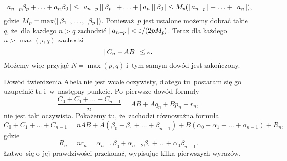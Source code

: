 \documentclass[a4paper,11pt]{article}
\begin{document}
\begin{equation}
  \label{eq:Leja-Funkcje-zespolone-17}
  |\, {  a_{ n - p } \beta_{ p } + \ldots + a_{ n } \beta_{ 0 }  } \,| \leq
  |\, {  a_{ n - p }  } \,| |\, {  \beta_{ p }  } \,| + \ldots + |\, {  a_{ n }  } \,|
  |\, {  \beta_{ 0 }  } \,| \leq
  M_{ p } ( |\, {  a_{ n - p }  } \,| + \ldots + |\, {  a_{ n }  } \,| ),
\end{equation}
gdzie
$M_{ p } = \max( |\, {  \beta_{ 1 }  } \,|, \ldots, |\, {  \beta_{ p }  } \,| )$.
Ponieważ~$p$ jest ustalone możemy dobrać takie $q$, że~dla każdego
$n > q$ zachodzić
$|\, {  a_{ n - p }  } \,| < \varepsilon / ( 2 p M_{ p } )$. Teraz dla każdego
$n > \max( p, q )$ zachodzi
\begin{equation}
  \label{eq:Leja-Funkcje-zespolone-18}
  |\, {  C_{ n } - AB  } \,| \leq \varepsilon.
\end{equation}
Możemy więc przyjąć $N = \max( p, q )$ i~tym samym dowód jest
zakończony.

\vspace{\spaceFour}





\noindent
{} Dowód twierdzenia Abela nie jest wcale oczywisty, dlatego
tu~postaram się go uzupełnić tu i~w~następny punkcie. Po~pierwsze dowód
formuły
\begin{equation}
  \label{eq:Leja-Funkcje-zespolone-19}
  \frac{ C_{ 0 } + C_{ 1 } + \ldots + C_{ n - 1 } }{ n } =
  AB + A q_{ n } + B p_{ n } + r_{ n },
\end{equation}
nie jest taki oczywista. Pokażemy tu, że~zachodzi równoważna formuła
\begin{equation}
  \label{eq:Leja-Funkcje-zespolone-20}
  C_{ 0 } + C_{ 1 } + \ldots + C_{ n - 1 } =
  n AB + A ( \beta_{ 0 } + \beta_{ 1 } + \ldots + \beta_{ n - 1 } )
  + B ( \alpha_{ 0 } + \alpha_{ 1 } + \ldots + \alpha_{ n - 1 } ) + R_{ n },
\end{equation}
gdzie
\begin{equation}
  \label{eq:Leja-Funkcje-zespolone-21}
  R_{ n } = n r_{ n } =
  \alpha_{ n - 1 } \beta_{ 0 } + \alpha_{ n - 2 } \beta_{ 1 } + \ldots + \alpha_{ 0 } \beta_{ n - 1 }.
\end{equation}
Łatwo~się o~jej prawdziwości przekonać, wypisując kilka pierwszych
wyrazów.
\end{document}
